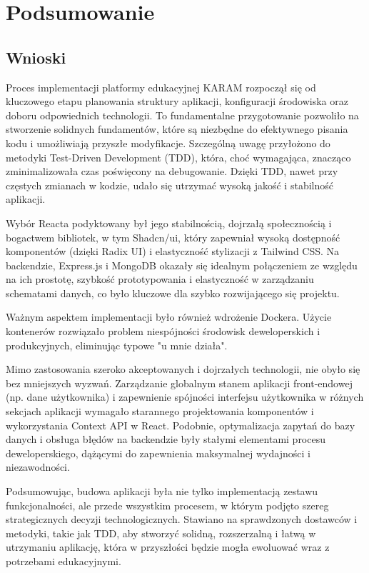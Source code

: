 \documentclass[shortabstract,inz]{iithesis}
\begin{document}
\chapter{Podsumowanie}

\section{Wnioski}
Proces implementacji platformy edukacyjnej KARAM rozpoczął się od kluczowego etapu planowania struktury aplikacji, konfiguracji środowiska oraz doboru odpowiednich technologii. To fundamentalne przygotowanie pozwoliło na stworzenie solidnych fundamentów, które są niezbędne do efektywnego pisania kodu i umożliwiają przyszłe modyfikacje. Szczególną uwagę przyłożono do metodyki Test-Driven Development (TDD), która, choć wymagająca, znacząco zminimalizowała czas poświęcony na debugowanie. Dzięki TDD, nawet przy częstych zmianach w kodzie, udało się utrzymać wysoką jakość i stabilność aplikacji.

Wybór Reacta podyktowany był jego stabilnością, dojrzałą społecznością i bogactwem bibliotek, w tym Shadcn/ui, który zapewniał wysoką dostępność komponentów (dzięki Radix UI) i elastyczność stylizacji z Tailwind CSS. Na backendzie, Express.js i MongoDB okazały się idealnym połączeniem ze względu na ich prostotę, szybkość prototypowania i elastyczność w zarządzaniu schematami danych, co było kluczowe dla szybko rozwijającego się projektu.

Ważnym aspektem implementacji było również wdrożenie Dockera. Użycie kontenerów rozwiązało problem niespójności środowisk deweloperskich i produkcyjnych, eliminując typowe "u mnie działa".

Mimo zastosowania szeroko akceptowanych i dojrzałych technologii, nie obyło się bez mniejszych wyzwań. Zarządzanie globalnym stanem aplikacji front-endowej (np. dane użytkownika) i zapewnienie spójności interfejsu użytkownika w różnych sekcjach aplikacji wymagało starannego projektowania komponentów i wykorzystania Context API w React. Podobnie, optymalizacja zapytań do bazy danych i obsługa błędów na backendzie były stałymi elementami procesu deweloperskiego, dążącymi do zapewnienia maksymalnej wydajności i niezawodności.

Podsumowując, budowa aplikacji była nie tylko implementacją zestawu funkcjonalności, ale przede wszystkim procesem, w którym podjęto szereg strategicznych decyzji technologicznych. Stawiano na sprawdzonych dostawców i metodyki, takie jak TDD, aby stworzyć solidną, rozszerzalną i łatwą w utrzymaniu aplikację, która w przyszłości będzie mogła ewoluować wraz z potrzebami edukacyjnymi.
\end{document}
